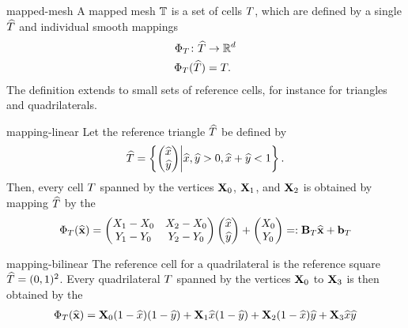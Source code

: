 \begin{Definition}{mapped-mesh}
  A mapped mesh $\mathbb T$ is a set of cells $T$, which are defined
  by a single  $\widehat{T}$ and individual
  smooth mappings
  \begin{gather}
    \begin{split}
      \Phi_T \colon \widehat{T} &\to \mathbb R^d\\
      \Phi_T(\widehat{T}) &= T.
    \end{split}
  \end{gather}
  The definition extends to small sets of reference cells, for
  instance for triangles and quadrilaterals.
\end{Definition}

\begin{Example}{mapping-linear}
  Let the reference triangle $\widehat{T}$ be defined by
  \begin{gather}
    \widehat{T} = \left\{
      \begin{pmatrix}
        \widehat{x}\\\widehat{y}
      \end{pmatrix}
      \middle|
      \widehat{x},\widehat{y} >0, \widehat{x}+\widehat{y} < 1
    \right\}.
  \end{gather}
  Then, every cell $T$ spanned by the vertices $\mathbf X_0$,
  $\mathbf X_1$, and $\mathbf X_2$ is obtained by mapping $\widehat{T}$ by
  the 
  \begin{gather}
    \Phi_T(\widehat{\mathbf x}) =
    \begin{pmatrix}
      X_1-X_0 & X_2 - X_0 \\ Y_1-Y_0 & Y_2 - Y_0
    \end{pmatrix}
    \begin{pmatrix}
      \widehat{x} \\ \widehat{y}
    \end{pmatrix}
    +
    \begin{pmatrix}
      X_0 \\ Y_0
    \end{pmatrix} =: \mathbf B_T \widehat{\mathbf x} + \mathbf b_T
  \end{gather}
\end{Example}

\begin{Example}{mapping-bilinear}
  The reference cell for a quadrilateral is the reference square
  $\widehat{T} = (0,1)^2$. Every quadrilateral $T$ spanned by the
  vertices $\mathbf X_0$ to $\mathbf X_3$ is then obtained by the
  \begin{gather}
    \Phi_T(\widehat{\mathbf x})
    = \mathbf X_0 (1-\widehat{x})(1-\widehat{y})
    + \mathbf X_1 \widehat{x}(1-\widehat{y})
    + \mathbf X_2 (1-\widehat{x})\widehat{y}
    + \mathbf X_3 \widehat{x}\widehat{y}
  \end{gather}
\end{Example}

